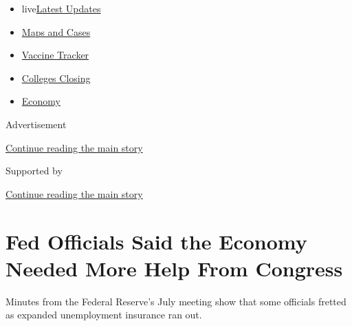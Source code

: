 \begin{itemize}
\tightlist
\item
  live\href{https://www.nytimes3xbfgragh.onion/2020/08/20/world/coronavirus-covid.html?name=styln-coronavirus-markets\&region=TOP_BANNER\&variant=undefined\&block=storyline_menu_recirc\&action=click\&pgtype=Article\&impression_id=273caf41-e387-11ea-91a7-0b74cd12f276}{Latest
  Updates}
\item
  \href{https://www.nytimes3xbfgragh.onion/interactive/2020/us/coronavirus-us-cases.html?name=styln-coronavirus-markets\&region=TOP_BANNER\&variant=undefined\&block=storyline_menu_recirc\&action=click\&pgtype=Article\&impression_id=273caf42-e387-11ea-91a7-0b74cd12f276}{Maps
  and Cases}
\item
  \href{https://www.nytimes3xbfgragh.onion/interactive/2020/science/coronavirus-vaccine-tracker.html?name=styln-coronavirus-markets\&region=TOP_BANNER\&variant=undefined\&block=storyline_menu_recirc\&action=click\&pgtype=Article\&impression_id=273caf43-e387-11ea-91a7-0b74cd12f276}{Vaccine
  Tracker}
\item
  \href{https://www.nytimes3xbfgragh.onion/2020/08/19/us/colleges-closing-covid.html?name=styln-coronavirus-markets\&region=TOP_BANNER\&variant=undefined\&block=storyline_menu_recirc\&action=click\&pgtype=Article\&impression_id=273cd650-e387-11ea-91a7-0b74cd12f276}{Colleges
  Closing}
\item
  \href{https://www.nytimes3xbfgragh.onion/live/2020/08/20/business/stock-market-today-coronavirus?name=styln-coronavirus-markets\&region=TOP_BANNER\&variant=undefined\&block=storyline_menu_recirc\&action=click\&pgtype=Article\&impression_id=273cd651-e387-11ea-91a7-0b74cd12f276}{Economy}
\end{itemize}

Advertisement

\protect\hyperlink{after-top}{Continue reading the main story}

Supported by

\protect\hyperlink{after-sponsor}{Continue reading the main story}

\hypertarget{fed-officials-said-the-economy-needed-more-help-from-congress}{%
\section{Fed Officials Said the Economy Needed More Help From
Congress}\label{fed-officials-said-the-economy-needed-more-help-from-congress}}

Minutes from the Federal Reserve's July meeting show that some officials
fretted as expanded unemployment insurance ran out.


